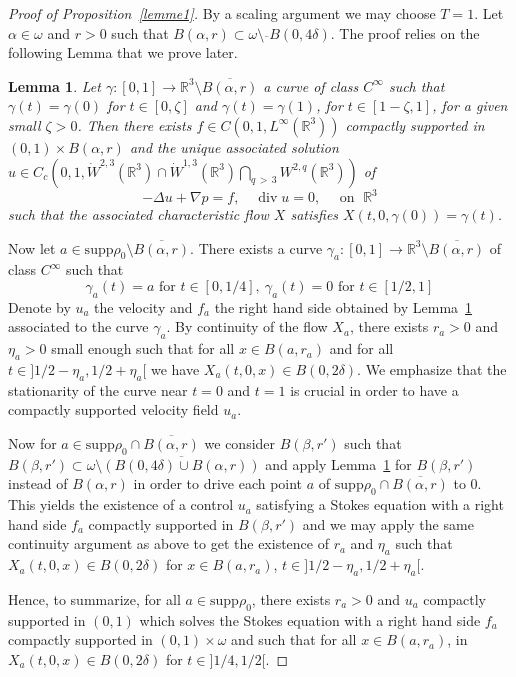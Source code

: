 \documentclass[10pt]{amsart}
\newtheorem{lemm}[theo]{Lemma}\newtheorem{prop}[theo]{Proposition}\newtheorem{coro}[theo]{Corollary}\newtheorem{conj}[theo]{Conjecture}
\theoremstyle{definition}\newtheorem{defi}[theo]{Definition}\newtheorem{rema}[theo]{Remark}\newtheorem{exam}[theo]{Example}\newtheorem{exem}[theo]{Example}\newtheorem{nota}[theo]{Notation}
\newcommand{\supp}{\mathrm{supp} }
\newcommand{\R}{\mathbb{R}}
\renewcommand{\div}{\operatorname{div}}
\begin{document}
\begin{proof}[Proof of Proposition~\ref{lemme1}]
By a scaling argument we may choose $T=1$. Let $\alpha \in \omega $ and $r>0$ such that $B(\alpha,r)\subset \omega \setminus \overline{}{B(0,4 \delta)}$. The proof relies on the following Lemma that we prove later.

\begin{lemm}\label{lemme2}
Let $ \gamma : [0,1] \to \R^3\setminus \overline{B(\alpha,r)}$ a curve of class $C^\infty$ such that $\gamma(t)=\gamma(0)$ for $t \in [0,\zeta]$ and $\gamma(t)=\gamma(1)$, for $ t \in [1-\zeta,1]$, for a given small $\zeta>0$. Then there exists $f\in C(0,1,L^\infty(\R^3))$ compactly supported in $(0,1)\times B(\alpha,r)$ and the unique associated solution $u\in C_c(0,1,\dot{W}^{2,3}(\R^3)\cap \dot{W}^{1,3}(\R^3)\bigcap_{q\,>\,3}W^{2,q}(\R^3))$ of
\[
-\Delta u +\nabla p = f,\quad \div u =0,\quad \text{ on }\; \R^3
\]
such that the associated characteristic flow $X$ satisfies $X(t,0,\gamma(0))=\gamma(t)$.
\end{lemm}


Now let $a \in \supp \rho_0 \setminus \overline{B(\alpha,r)}$.
There exists a curve $\gamma_a:[0,1] \to \R^3 \setminus \overline{B(\alpha,r)}$ of class $C^\infty$ such that
\[
\gamma_a(t)=a \text{ for } t\in[0,1/4], \: \gamma_a(t)=0 \text{ for }t\in[1/2, 1]
\]
Denote by $u_a$ the velocity and $f_a$ the right hand side obtained by Lemma~\ref{lemme2} associated to the curve $\gamma_a$. By continuity of the flow $X_a$, there exists $r_a>0$ and $\eta_a>0$ small enough such that for all $x \in B(a,r_a)$ and for all $t \in]1/2-\eta_a,1/2+\eta_a[$ we have $X_a(t,0,x)\in B(0,2\delta)$. We emphasize that the stationarity of the curve near $t=0$ and $t=1$ is crucial in order to have a compactly supported velocity field $u_a$.

Now for $ a \in \supp \rho_0\cap \overline{B(\alpha,r)} $ we consider $B(\beta,r')$ such that $B(\beta,r') \subset \omega \setminus \overline{(B(0,4\delta)\cup B(\alpha,r))}$ and apply Lemma~\ref{lemme2} for $B(\beta,r')$ instead of $B(\alpha,r)$ in order to drive each point $a$ of $\supp \rho_0\cap \overline{B(\alpha,r)}$ to $0$. This yields the existence of a control $u_a$ satisfying a Stokes equation with a right hand side $f_a$ compactly supported in $B(\beta,r')$ and we may apply the same continuity argument as above to get the existence of $r_a$ and $\eta_a$ such that $X_a(t,0,x)\in B(0,2\delta)$ for $x\in B(a,r_a)$, $t\in]1/2-\eta_a,1/2+\eta_a[$.

Hence, to summarize, for all $a\in \supp \rho_0 $, there exists $r_a>0$ and $u_a$ compactly supported in $(0,1)$ which solves the Stokes equation with a right hand side $f_a$ compactly supported in $(0,1)\times \omega$ and such that for all $x \in B(a,r_a)$, in $X_a(t,0,x) \in B(0,2\delta)$ for $t\in]1/4,1/2[$.



\end{proof}
\end{document}
